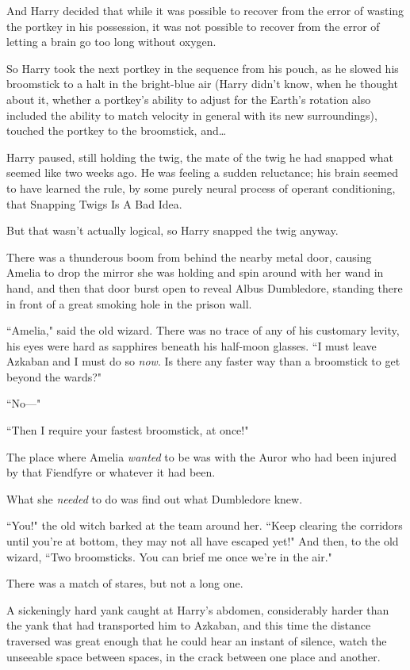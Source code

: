 And Harry decided that while it was possible to recover from the error of wasting the portkey in his possession, it was not possible to recover from the error of letting a brain go too long without oxygen.

So Harry took the next portkey in the sequence from his pouch, as he slowed his broomstick to a halt in the bright-blue air (Harry didn't know, when he thought about it, whether a portkey's ability to adjust for the Earth's rotation also included the ability to match velocity in general with its new surroundings), touched the portkey to the broomstick, and…

Harry paused, still holding the twig, the mate of the twig he had snapped what seemed like two weeks ago. He was feeling a sudden reluctance; his brain seemed to have learned the rule, by some purely neural process of operant conditioning, that Snapping Twigs Is A Bad Idea.

But that wasn't actually logical, so Harry snapped the twig anyway.

\later

There was a thunderous boom from behind the nearby metal door, causing Amelia to drop the mirror she was holding and spin around with her wand in hand, and then that door burst open to reveal Albus Dumbledore, standing there in front of a great smoking hole in the prison wall.

``Amelia," said the old wizard. There was no trace of any of his customary levity, his eyes were hard as sapphires beneath his half-moon glasses. ``I must leave Azkaban and I must do so \emph{now}. Is there any faster way than a broomstick to get beyond the wards?"

``No—"

``Then I require your fastest broomstick, at once!"

The place where Amelia \emph{wanted} to be was with the Auror who had been injured by that Fiendfyre or whatever it had been.

What she \emph{needed} to do was find out what Dumbledore knew.

``You!" the old witch barked at the team around her. ``Keep clearing the corridors until you're at bottom, they may not all have escaped yet!" And then, to the old wizard, ``Two broomsticks. You can brief me once we're in the air."

There was a match of stares, but not a long one.

\later

A sickeningly hard yank caught at Harry's abdomen, considerably harder than the yank that had transported him to Azkaban, and this time the distance traversed was great enough that he could hear an instant of silence, watch the unseeable space between spaces, in the crack between one place and another.

